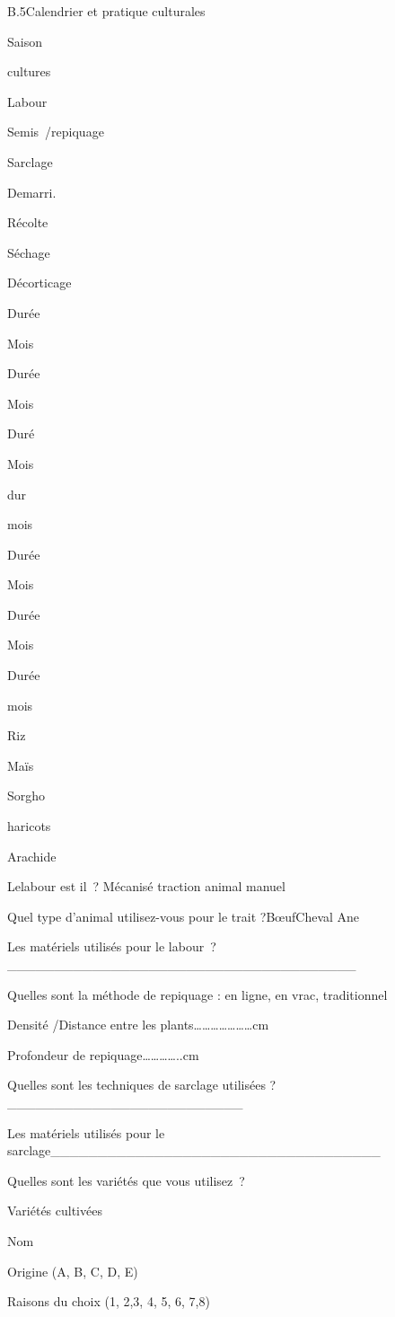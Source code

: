 \documentclass[12pt,oneside]{report}
\begin{document}
B.5Calendrier et pratique culturales

Saison

cultures

Labour

Semis /repiquage

Sarclage

Demarri.

Récolte

Séchage

Décorticage

Durée

Mois

Durée

Mois

Duré

Mois

dur

mois

Durée

Mois

Durée

Mois

Durée

mois

Riz

Maïs

Sorgho

haricots

Arachide

Lelabour est il ? Mécanisé traction animal manuel

Quel type d’animal utilisez-vous pour le trait ?BœufCheval     Ane

Les matériels utilisés pour le labour ?\_\_\_\_\_\_\_\_\_\_\_\_\_\_\_\_\_\_\_\_\_\_\_\_\_\_\_\_\_\_\_\_\_\_\_\_\_

Quelles sont la méthode de repiquage : en ligne,  en vrac,  traditionnel

Densité /Distance entre les plants…………………cm

Profondeur de repiquage…………..cm

Quelles sont les techniques de sarclage utilisées ?\_\_\_\_\_\_\_\_\_\_\_\_\_\_\_\_\_\_\_\_\_\_\_\_\_

Les matériels utilisés pour le sarclage\_\_\_\_\_\_\_\_\_\_\_\_\_\_\_\_\_\_\_\_\_\_\_\_\_\_\_\_\_\_\_\_\_\_\_

Quelles  sont les variétés que vous utilisez ?

Variétés cultivées

Nom

Origine (A, B, C, D, E)

Raisons du choix (1, 2,3, 4, 5, 6, 7,8)
\end{document}
